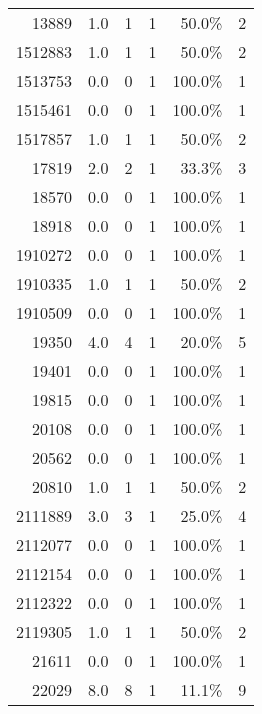 \begin{longtable}{lrrrrr}
	\multicolumn{1}{r}{13889} & 1.0   & 1     & 1     & 50.0\% & 2 \\
	\multicolumn{1}{r}{1512883} & 1.0   & 1     & 1     & 50.0\% & 2 \\
	\multicolumn{1}{r}{1513753} & 0.0   & 0     & 1     & 100.0\% & 1 \\
	\multicolumn{1}{r}{1515461} & 0.0   & 0     & 1     & 100.0\% & 1 \\
	\multicolumn{1}{r}{1517857} & 1.0   & 1     & 1     & 50.0\% & 2 \\
	\multicolumn{1}{r}{17819} & 2.0   & 2     & 1     & 33.3\% & 3 \\
	\multicolumn{1}{r}{18570} & 0.0   & 0     & 1     & 100.0\% & 1 \\
	\multicolumn{1}{r}{18918} & 0.0   & 0     & 1     & 100.0\% & 1 \\
	\multicolumn{1}{r}{1910272} & 0.0   & 0     & 1     & 100.0\% & 1 \\
	\multicolumn{1}{r}{1910335} & 1.0   & 1     & 1     & 50.0\% & 2 \\
	\multicolumn{1}{r}{1910509} & 0.0   & 0     & 1     & 100.0\% & 1 \\
	\multicolumn{1}{r}{19350} & 4.0   & 4     & 1     & 20.0\% & 5 \\
	\multicolumn{1}{r}{19401} & 0.0   & 0     & 1     & 100.0\% & 1 \\
	\multicolumn{1}{r}{19815} & 0.0   & 0     & 1     & 100.0\% & 1 \\
	\multicolumn{1}{r}{20108} & 0.0   & 0     & 1     & 100.0\% & 1 \\
	\multicolumn{1}{r}{20562} & 0.0   & 0     & 1     & 100.0\% & 1 \\
	\multicolumn{1}{r}{20810} & 1.0   & 1     & 1     & 50.0\% & 2 \\
	\multicolumn{1}{r}{2111889} & 3.0   & 3     & 1     & 25.0\% & 4 \\
	\multicolumn{1}{r}{2112077} & 0.0   & 0     & 1     & 100.0\% & 1 \\
	\multicolumn{1}{r}{2112154} & 0.0   & 0     & 1     & 100.0\% & 1 \\
	\multicolumn{1}{r}{2112322} & 0.0   & 0     & 1     & 100.0\% & 1 \\
	\multicolumn{1}{r}{2119305} & 1.0   & 1     & 1     & 50.0\% & 2 \\
	\multicolumn{1}{r}{21611} & 0.0   & 0     & 1     & 100.0\% & 1 \\
	\multicolumn{1}{r}{22029} & 8.0   & 8     & 1     & 11.1\% & 9 \\

\end{longtable}
